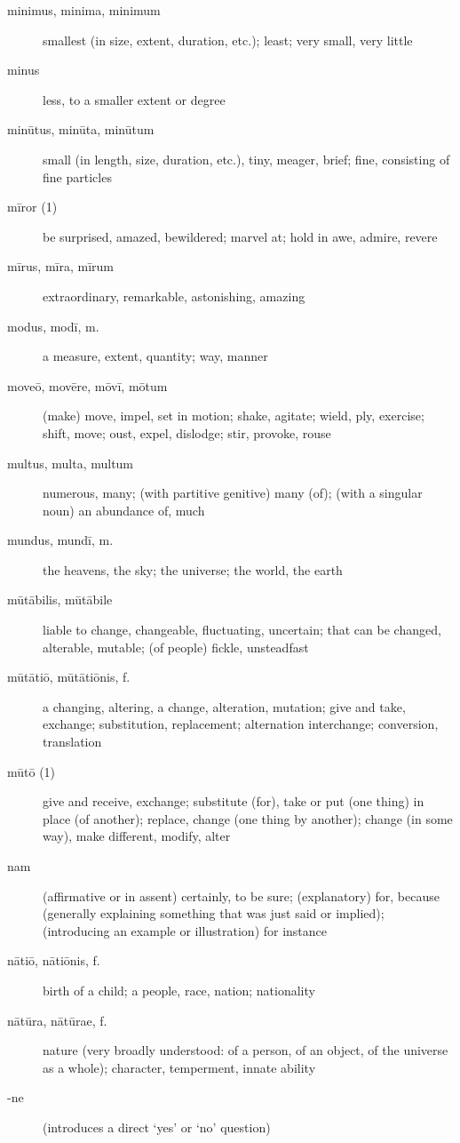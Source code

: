 \begin{description}
    \item[minimus, minima, minimum] smallest (in size, extent, duration, etc.); least; very small, very little
    \item[minus] less, to a smaller extent or degree
    \item[minūtus, minūta, minūtum] small (in length, size, duration, etc.), tiny, meager, brief; fine, consisting of fine particles
    \item[mīror (1)] be surprised, amazed, bewildered; marvel at; hold in awe, admire, revere
    \item[mīrus, mīra, mīrum] extraordinary, remarkable, astonishing, amazing
    \item[modus, modī, m.] a measure, extent, quantity; way, manner
    \item[moveō, movēre, mōvī, mōtum] (make) move, impel, set in motion; shake, agitate; wield, ply, exercise; shift, move; oust, expel, dislodge; stir, provoke, rouse
    \item[multus, multa, multum] numerous, many; (with partitive genitive) many (of); (with a singular noun) an abundance of, much
    \item[mundus, mundī, m.] the heavens, the sky; the universe; the world, the earth
    \item[mūtābilis, mūtābile] liable to change, changeable, fluctuating, uncertain; that can be changed, alterable, mutable; (of people) fickle, unsteadfast
    \item[mūtātiō, mūtātiōnis, f.] a changing, altering, a change, alteration, mutation; give and take, exchange; substitution, replacement; alternation interchange; conversion, translation
    \item[mūtō (1)] give and receive, exchange; substitute (for), take or put (one thing) in place (of another); replace, change (one thing by another); change (in some way), make different, modify, alter
    \item[nam] (affirmative or in assent) certainly, to be sure; (explanatory) for, because (generally explaining something that was just said or implied); (introducing an example or illustration) for instance
    \item[nātiō, nātiōnis, f.] birth of a child; a people, race, nation; nationality
    \item[nātūra, nātūrae, f.] nature (very broadly understood: of a person, of an object, of the universe as a whole); character, temperment, innate ability
    \item[-ne] (introduces a direct `yes' or `no' question)

\end{description}
